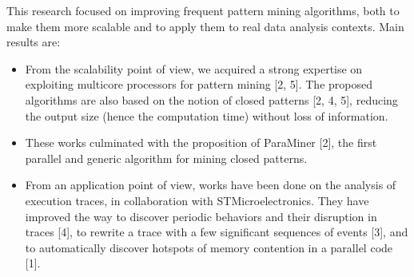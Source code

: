 This research focused on improving frequent pattern mining algorithms, both to make them more scalable and to apply them to real data analysis contexts. Main results are:

\begin{itemize}
\item  From the scalability point of view, we acquired a strong expertise on exploiting multicore processors for pattern mining [2, 5].
The proposed algorithms are also based on the notion of closed patterns [2, 4, 5], reducing the output size (hence the computation time) without loss of information.

\item These works culminated with the proposition of ParaMiner [2], the first parallel and generic algorithm for mining closed patterns.

\item From an application point of view, works have been done on the analysis of execution traces, in collaboration with STMicroelectronics.
They have improved the way to discover periodic behaviors and their disruption in traces [4], to rewrite a trace with a few significant sequences of events [3], and to automatically discover hotspots of memory contention in a parallel code [1].
\end{itemize}

